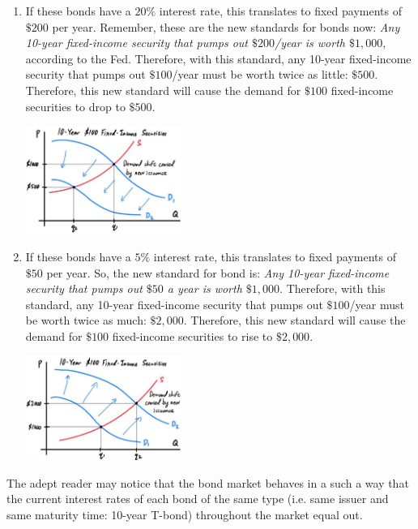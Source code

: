 \documentclass{article}
\begin{document}
    \begin{enumerate}
      \item If these bonds have a $20\%$ interest rate, this translates to fixed payments of $\$200$ per year. Remember, these are the new standards for bonds now: \textit{Any 10-year fixed-income security that pumps out $\$200$/year is worth $\$1,000$}, according to the Fed. Therefore, with this standard, any 10-year fixed-income security that pumps out $\$100$/year must be worth twice as little: $\$500$. Therefore, this new standard will cause the demand for $\$100$ fixed-income securities to drop to $\$500$.
      \begin{center}
        \includegraphics[width=0.4\textwidth]{img/Bond_Demand_Decrease.jpg}
      \end{center}
      \item If these bonds have a $5\%$ interest rate, this translates to fixed payments of $\$50$ per year. So, the new standard for bond is: \textit{Any 10-year fixed-income security that pumps out $\$50$ a year is worth $\$1,000$}. Therefore, with this standard, any 10-year fixed-income security that pumps out $\$100$/year must be worth twice as much: $\$2,000$. Therefore, this new standard will cause the demand for $\$100$ fixed-income securities to rise to $\$2,000$.
      \begin{center}
        \includegraphics[width=0.4\textwidth]{img/Bond_Demand_Increase.jpg}
      \end{center}
    \end{enumerate}

    The adept reader may notice that the bond market behaves in a such a way that the current interest rates of each bond of the same type (i.e. same issuer and same maturity time: 10-year T-bond) throughout the market equal out.
\end{document}
